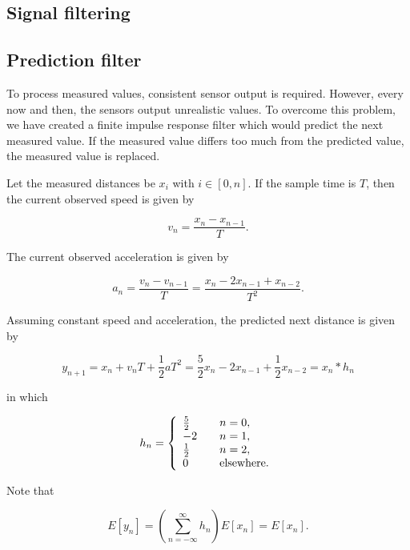 \documentclass[11pt,titlepage]{report}
\begin{document}
\begin{appendices}
\chapter{Signal filtering}
\label{app:signal-filtering}
\section{Prediction filter}
To process measured values, consistent sensor output is required. However, every now and then, the sensors output unrealistic values. To overcome this problem, we have created a finite impulse response filter which would predict the next measured value. If the measured value differs too much from the predicted value, the measured value is replaced.

Let the measured distances be $x_i$ with $i \in [0,n]$. If the sample time is $T$, then the current observed speed is given by

\begin{equation}
	v_n = \frac{x_{n} - x_{n-1}}{T}.
\end{equation}

The current observed acceleration is given by

\begin{equation}
	a_n = \frac{v_n - v_{n-1}}{T} = \frac{x_{n} - 2 x_{n-1} + x_{n-2}}{T^2}.
\end{equation}

Assuming constant speed and acceleration, the predicted next distance is given by

\begin{equation}
	y_{n+1} = x_{n} + v_n T + \frac{1}{2} a T^2 = \frac{5}{2} x_n - 2 x_{n-1} + \frac{1}{2} x_{n-2}= x_n \ast h_n
\end{equation}

in which

\begin{equation}
	h_n = \left\{
	\begin{array}{l l}
		\frac{5}{2} & \quad n = 0, \\
		-2 & \quad n = 1, \\
		\frac{1}{2} & \quad n = 2, \\
		0 & \quad \text{elsewhere}.
	\end{array}
	\right.
\end{equation}

Note that

\begin{equation}
	E[y_n] = \left( \sum_{n=-\infty}^{\infty} h_n \right) E[x_n] = E[x_n].
\end{equation}


\end{appendices}
\end{document}
